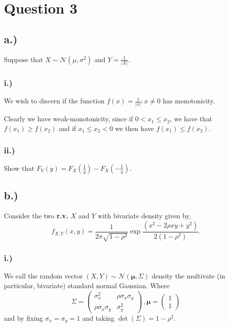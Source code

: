 
\section{Question 3} %
\label{sec:question3}

%
\subsection{a.)}
Suppose that $X \sim \mathcal{N}(\mu,\sigma^2)$ and $Y = \frac{1}{|X|}$.

%
\subsubsection{i.)}
We wish to discern if the function $f(x)= \frac{1}{|x|} : x \neq 0$ has
monotonicity.

Clearly we have weak-monotonicity, since if $0 < x_1 \leq x_2$, we have that
$f(x_1) \geq f(x_2)$ and if $x_1 \leq x_2 < 0$ we then have $f(x_1) \leq f(x_2)$.

%
\subsubsection{ii.)}
Show that $F_Y(y) = F_X(\frac{1}{y}) - F_X(-\frac{1}{y})$.

%
\subsection{b.)}
Consider the two \textbf{r.v.} $X$ and $Y$ with bivariate density given by,
\[
 f_{X,Y}(x,y) = \frac{1}{2\pi \sqrt{1 - \rho^2}}
 \exp{ \frac{ (x^2 - 2 \rho x y + y^2) }{2(1-\rho^2)} }.
\]

%
\subsubsection{i.)}
We call the random vector $(X,Y) \sim \mathcal{N}(\boldsymbol{\mu},\Sigma)$
density the multivate (in particular, bivariate) standard normal Gaussian.
Where
\[
 \Sigma =
 \begin{pmatrix}
  \sigma_x^2 & \rho \sigma_x \sigma_y \\
  \rho \sigma_x \sigma_y & \sigma_y^2
 \end{pmatrix}
 \, ,
 \boldsymbol{\mu} =
 \begin{pmatrix}
  1 \\ 1
 \end{pmatrix}
\]
and by fixing $\sigma_x = \sigma_y = 1$ and taking $\det(\Sigma)=1-\rho^2$.

